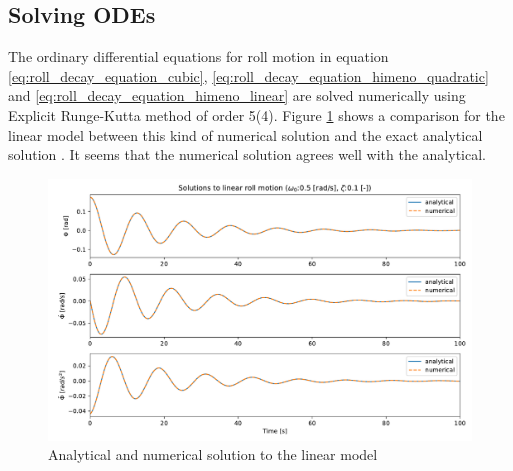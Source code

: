 \subsection{Solving ODEs}
\label{se:analytical_solution}
The ordinary differential equations for roll motion in equation \ref{eq:roll_decay_equation_cubic}, \ref{eq:roll_decay_equation_himeno_quadratic} and
\ref{eq:roll_decay_equation_himeno_linear} are solved numerically using Explicit Runge-Kutta method of order 5(4). Figure \ref{fig:analytical} shows a comparison for the linear model between this kind of numerical solution and the exact analytical solution \parencite{henry_peter_piehl_ship_nodate}. It seems that the numerical solution agrees well with the analytical. 

\begin{figure}[h]
    \centering
    \includegraphics[width=\columnwidth]{figures/analytical.pdf}
    \caption{Analytical and numerical solution to the linear model}
    \label{fig:analytical}
\end{figure}